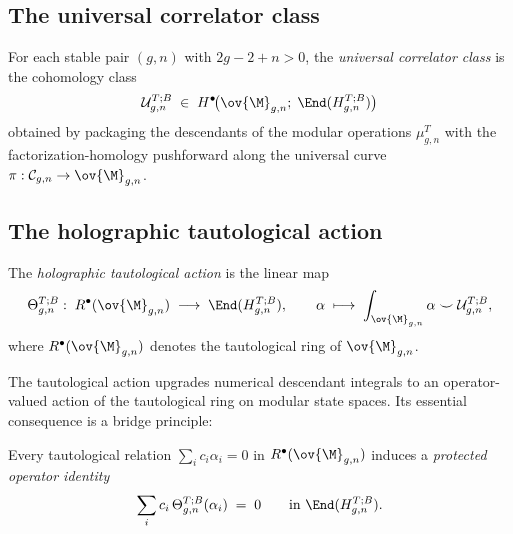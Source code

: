 \subsection{The universal correlator class}
\label{subsec:universal-correlator-class}

\begin{definition}
\label{def:universal-correlator-class}
For each stable pair $(g,n)$ with $2g-2+n > 0$, the \emph{universal correlator class} is
the cohomology class
\begin{equation}
\label{eq:universal-correlator-class}
\mathcal{U}_{g,n}^{T;B}
\;\in\;
H^\bullet\!\bigl(\ov{\M}_{g,n};\;\End(H_{g,n}^{T;B})\bigr)
\end{equation}
obtained by packaging the descendants of the modular operations $\mu_{g,n}^T$ with the
factorization-homology pushforward along the universal curve
$\pi: \mathcal{C}_{g,n} \to \ov{\M}_{g,n}$.
\end{definition}

\subsection{The holographic tautological action}
\label{subsec:holographic-tautological-action}

\begin{definition}
\label{def:holographic-tautological-action}
The \emph{holographic tautological action} is the linear map
\begin{equation}
\label{eq:tautological-action}
\Theta_{g,n}^{T;B}:\;
R^\bullet(\ov{\M}_{g,n})
\;\longrightarrow\;
\End(H_{g,n}^{T;B}),
\qquad
\alpha \;\longmapsto\;
\int_{\ov{\M}_{g,n}} \alpha \smile \mathcal{U}_{g,n}^{T;B},
\end{equation}
where $R^\bullet(\ov{\M}_{g,n})$ denotes the tautological ring of $\ov{\M}_{g,n}$.
\end{definition}

The tautological action upgrades numerical descendant integrals to an operator-valued
action of the tautological ring on modular state spaces.  Its essential consequence is
a bridge principle:

\begin{proposition}
\label{prop:tautological-holographic-bridge}
Every tautological relation $\sum_i c_i \alpha_i = 0$ in $R^\bullet(\ov{\M}_{g,n})$
induces a \emph{protected operator identity}
\[
\sum_i c_i\,\Theta_{g,n}^{T;B}(\alpha_i) \;=\; 0
\qquad \text{in } \End(H_{g,n}^{T;B}).
\]
\end{proposition}

